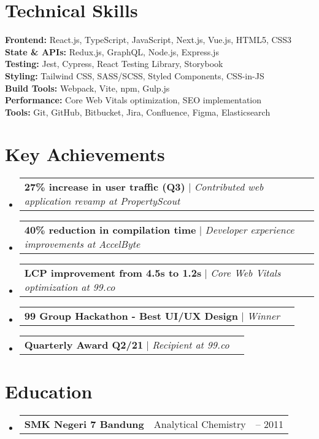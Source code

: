 \documentclass[a4paper, 11pt]{article}
\makeatletter
\newcommand{\resumeSubheading}[4]{
  \vspace{-2pt}\item
    \begin{tabularx}{0.987\textwidth}[t]{
  >{\raggedright\arraybackslash}X
  >{\centering\arraybackslash}X
  >{\raggedleft\arraybackslash}X }
      \textbf{#1} & #2 & #3 \\
    \end{tabularx}
    \textit{\small#4}\\
    \vspace{-7pt}
}
\newcommand{\resumeProjectHeading}[2]{
    \item
    \begin{tabular*}{0.987\textwidth}{l@{\extracolsep{\fill}}r}
      \small#1\\
    \end{tabular*}\vspace{-7pt}
}
\newcommand{\resumeSubHeadingListStart}{\begin{itemize}[leftmargin=0.1in, label={}]}
\newcommand{\resumeSubHeadingListEnd}{\end{itemize}\vspace{5pt}}
\makeatother
\begin{document}
\section{Technical Skills}
  \resumeSubHeadingListStart
    \small{\item{
      \textbf{Frontend:}{ React.js, TypeScript, JavaScript, Next.js, Vue.js, HTML5, CSS3} \\
      \textbf{State \& APIs:}{ Redux.js, GraphQL, Node.js, Express.js} \\
      \textbf{Testing:}{ Jest, Cypress, React Testing Library, Storybook} \\
      \textbf{Styling:}{ Tailwind CSS, SASS/SCSS, Styled Components, CSS-in-JS} \\
      \textbf{Build Tools:}{ Webpack, Vite, npm, Gulp.js} \\
      \textbf{Performance:}{ Core Web Vitals optimization, SEO implementation} \\
      \textbf{Tools:}{ Git, GitHub, Bitbucket, Jira, Confluence, Figma, Elasticsearch}
    }}
  \resumeSubHeadingListEnd

\section{Key Achievements}
    \resumeSubHeadingListStart
        \resumeProjectHeading
            {\textbf{27\% increase in user traffic (Q3)} $|$ \emph{Contributed web application revamp at PropertyScout}}{2023}
        \resumeProjectHeading
            {\textbf{40\% reduction in compilation time} $|$ \emph{Developer experience improvements at AccelByte}}{2022}
        \resumeProjectHeading
            {\textbf{LCP improvement from 4.5s to 1.2s} $|$ \emph{Core Web Vitals optimization at 99.co}}{2021}
        \resumeProjectHeading
            {\textbf{99 Group Hackathon - Best UI/UX Design} $|$ \emph{Winner}}{2021}
        \resumeProjectHeading
            {\textbf{Quarterly Award Q2/21} $|$ \emph{Recipient at 99.co}}{2021}
    \resumeSubHeadingListEnd

\section{Education}
    \resumeSubHeadingListStart
        \resumeSubheading
            {SMK Negeri 7 Bandung}{Analytical Chemistry}{2009 -- 2011}{}
    \resumeSubHeadingListEnd
\end{document}
